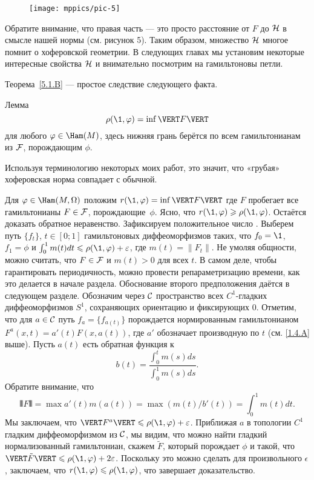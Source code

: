 \begin{figure}[ht!]
\vskip0mm
\centering
\texttt{[image: mppics/pic-5]}
\caption{}\label{pic-5}
\vskip0mm
\end{figure}

Обратите внимание, что правая часть --- это просто расстояние от $F$ до $\mathcal{H}$ в смысле нашей нормы (см. рисунок 5).
Таким образом, множество $\mathcal{H}$ многое помнит о хоферовской геометрии.
В следующих главах мы установим некоторые интересные свойства $\mathcal{H}$ и внимательно посмотрим на гамильтоновы петли.

Теорема~\ref{5.1.B} --- простое следствие следующего факта.

\begin{thm}{Лемма}\label{5.1.C}
\[\rho (\1, \phi) = \inf \VERT F \VERT\]
для любого $\phi \in \Ham (M)$, здесь нижняя грань берётся по всем гамильтонианам из $\mathcal{F}$, порождающим $\phi$.
\end{thm}

Используя терминологию некоторых моих работ, это значит, что «грубая» хоферовская норма совпадает с обычной.

Для $\phi \in \Ham (M, \Omega)$ положим $r (\1, \phi) \z= \inf \VERT F \VERT$ где $F$ пробегает все гамильтонианы $F \in \mathcal{F}$, порождающие~$\phi$.
Ясно, что $r (\1, \phi) \ge \rho (\1, \phi)$.
Остаётся доказать обратное неравенство.
Зафиксируем положительное число .
Выберем путь $\{f_t\}$, $t \in [0; 1]$ гамильтоновых диффеоморфизмов таких, что $f_0 = \1$, $f_1 = \phi$ и  $\int_0^1 m (t) dt \le \rho (\1, \phi) + \epsilon$, где $m (t) = \| F_t \|$.
Не умоляя общности, можно считать, что $F \in \mathcal{F}$ и $m (t)> 0$ для всех $t$.
В самом деле, чтобы гарантировать периодичность, можно провести репараметризацию времени, как это делается в начале раздела.
Обоснование второго предположения даётся в следующем разделе.
Обозначим через $\mathcal{C}$ пространство всех $C^1$-гладких диффеоморфизмов $S^1$, сохраняющих ориентацию и фиксирующих $0$.
Отметим, что для $a \in \mathcal{C}$ путь $f_a = \{f_{a(t)}\}$ порождается нормированным гамильтонианом $F^a (x, t) = a' (t) F (x, a(t))$, где $a'$ обозначает производную по $t$ (см. \ref{1.4.A} выше).
Пусть $a(t)$ есть обратная функция к 
\[b(t)
=
\frac{\int_0^t m(s)ds}{\int_0^1 m(s)ds}.\]
Обратите внимание, что 
\[\VERT F \VERT = \max a' (t) m (a (t)) = \max (m (t) / b'(t)) = \int_0^1m (t) dt.\]
Мы заключаем, что $\VERT F^a \VERT \le \rho (\1, \phi) + \epsilon$.
Приближая $a$ в топологии $C^1$ гладким диффеоморфизмом из $\mathcal{C}$, мы видим, что можно найти гладкий нормализованный гамильтониан, скажем $\tilde F$, который порождает $\phi$ и такой, что $\VERT \tilde F \VERT \le \rho (\1, \phi) + 2\epsilon$.
Поскольку это можно сделать для произвольного $\epsilon$, заключаем, что $r (\1, \phi) \le \rho (\1, \phi)$, что завершает доказательство.
\qeds


